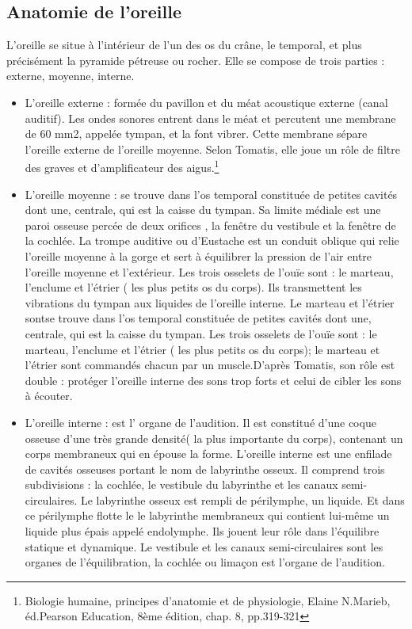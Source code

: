 \subsection{Anatomie de l'oreille}
L'oreille se situe à l'intérieur de l'un des os du crâne, le temporal, et plus précisément la pyramide pétreuse ou rocher. Elle se compose de trois parties : externe, moyenne, interne.
\begin{itemize}
	\item  L'oreille externe : formée du pavillon et du méat acoustique externe
(canal auditif). Les ondes sonores entrent dans le méat et percutent
une membrane de 60 mm2, appelée tympan, et la font vibrer. Cette membrane
sépare l'oreille externe de l'oreille moyenne. Selon Tomatis, elle
joue un rôle de filtre des graves et d'amplificateur des aigus.\footnote{Biologie humaine, principes d'anatomie et de physiologie, Elaine N.Marieb,
	éd.Pearson Education, 8ème édition, chap. 8, pp.319-321}
	\item L'oreille moyenne :
se trouve dans l'os temporal constituée de petites cavités dont une, centrale, qui est la caisse du tympan. Sa limite
médiale est une paroi osseuse percée de deux orifices , la fenêtre
du vestibule et la fenêtre de la cochlée. La trompe auditive ou d'Eustache
est un conduit oblique qui relie l'oreille moyenne à la gorge et sert
à équilibrer la pression de l'air entre l'oreille moyenne et l'extérieur.
Les trois osselets de l'ouïe sont : le marteau, l'enclume et l'étrier
( les plus petits os du corps). Ils transmettent les vibrations du
tympan aux liquides de l'oreille interne. Le marteau et l'étrier sontse
trouve dans l'os temporal constituée de petites cavités dont une,
centrale, qui est la caisse du tympan. Les trois osselets de l'ouïe
sont : le marteau, l'enclume et l'étrier ( les plus petits os du corps);
le marteau et l'étrier sont commandés chacun par un muscle.D'après
Tomatis, son rôle est double : protéger l'oreille interne des sons
trop forts et celui de cibler les sons à écouter.
\item L'oreille interne
: est l' organe de l\textquoteright audition. Il
est constitué d'une coque osseuse d'une très grande densité( la plus
importante du corps), contenant un corps membraneux qui en épouse
la forme. L'oreille interne est une enfilade de cavités osseuses portant
le nom de labyrinthe osseux. Il comprend trois subdivisions : la cochlée,
le vestibule du labyrinthe et les canaux semi-circulaires. Le labyrinthe
osseux est rempli de périlymphe, un liquide. Et dans ce périlymphe
flotte le le labyrinthe membraneux qui contient lui-même un liquide
plus épais appelé endolymphe. Ils jouent leur rôle dans l'équilibre
statique et dynamique. Le vestibule et les canaux semi-circulaires
sont les organes de l\textquoteright équilibration, la cochlée ou
limaçon est l'organe de l'audition. 
\end{itemize}
